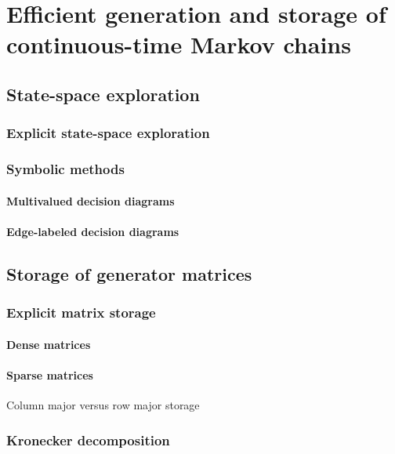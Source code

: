 \chapter{Efficient generation and storage of continuous-time Markov chains}
\label{chap:genstor}

\section{State-space exploration}

\subsection{Explicit state-space exploration}

\subsection{Symbolic methods}

\subsubsection{Multivalued decision diagrams}

\subsubsection{Edge-labeled decision diagrams}

\section{Storage of generator matrices}

\subsection{Explicit matrix storage}

\subsubsection{Dense matrices}

\subsubsection{Sparse matrices}

Column major versus row major storage

\subsection{Kronecker decomposition}

